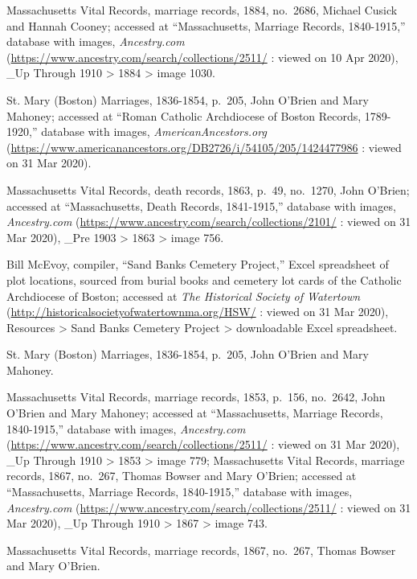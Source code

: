 \begin{thebibliography}{999}
Massachusetts Vital Records, marriage records, 1884, no.\ 2686, Michael Cusick and Hannah Cooney; accessed at ``Massachusetts, Marriage Records, 1840-1915,'' database with images, \textit{Ancestry.com} (\url{https://www.ancestry.com/search/collections/2511/} : viewed on 10 Apr 2020), \_Up Through 1910 > 1884 > image 1030.


St. Mary (Boston) Marriages, 1836-1854, p.\ 205, John O'Brien and Mary Mahoney; accessed at ``Roman Catholic Archdiocese of Boston Records, 1789-1920,'' database with images, \textit{AmericanAncestors.org} (\url{https://www.americanancestors.org/DB2726/i/54105/205/1424477986} : viewed on 31 Mar 2020).

Massachusetts Vital Records, death records, 1863, p.\ 49, no.\ 1270, John O'Brien; accessed at ``Massachusetts, Death Records, 1841-1915,'' database with images, \textit{Ancestry.com} (\url{https://www.ancestry.com/search/collections/2101/} : viewed on 31 Mar 2020), \_Pre 1903 > 1863 > image 756.

Bill McEvoy, compiler, ``Sand Banks Cemetery Project,'' Excel spreadsheet of plot locations, sourced from burial books and cemetery lot cards of the Catholic Archdiocese of Boston; accessed at \textit{The Historical Society of Watertown} (\url{http://historicalsocietyofwatertownma.org/HSW/} : viewed on 31 Mar 2020), Resources > Sand Banks Cemetery Project > downloadable Excel spreadsheet.

St. Mary (Boston) Marriages, 1836-1854, p.\ 205, John O'Brien and Mary Mahoney.

Massachusetts Vital Records, marriage records, 1853, p.\ 156, no.\ 2642, John O'Brien and Mary Mahoney; accessed at ``Massachusetts, Marriage Records, 1840-1915,'' database with images, \textit{Ancestry.com} (\url{https://www.ancestry.com/search/collections/2511/} : viewed on 31 Mar 2020), \_Up Through 1910 > 1853 > image 779; Massachusetts Vital Records, marriage records, 1867, no.\ 267, Thomas Bowser and Mary O'Brien; accessed at ``Massachusetts, Marriage Records, 1840-1915,'' database with images, \textit{Ancestry.com} (\url{https://www.ancestry.com/search/collections/2511/} : viewed on 31 Mar 2020), \_Up Through 1910 > 1867 > image 743.

Massachusetts Vital Records, marriage records, 1867, no.\ 267, Thomas Bowser and Mary O'Brien.


\end{thebibliography}

